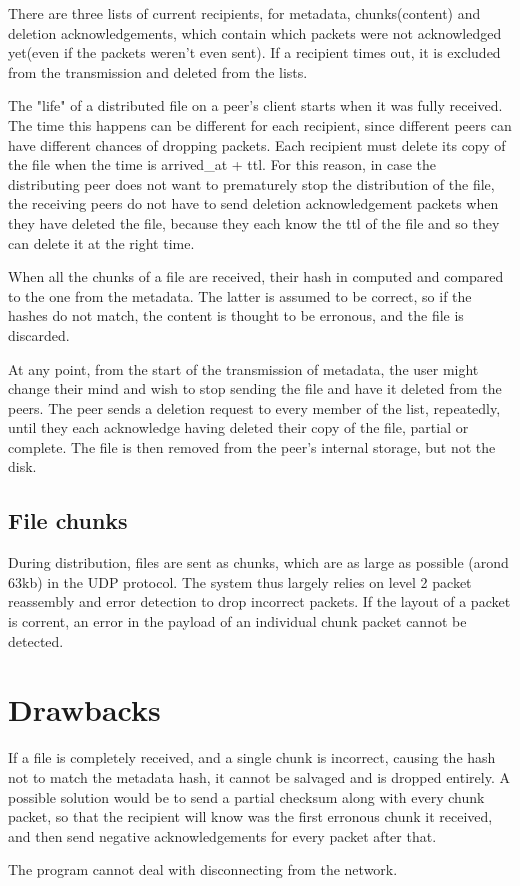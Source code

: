 \documentclass[a4paper, 10pt]{report}
\begin{document}
There are three lists of current recipients, for metadata, chunks(content) and deletion acknowledgements, which contain which packets were not acknowledged yet(even if the packets weren't even sent). If a recipient times out, it is excluded from the transmission and deleted from the lists.

The "life" of a distributed file on a peer's client starts when it was fully received. The time this happens can be different for each recipient, since different peers can have different chances of dropping packets. Each recipient must delete its copy of the file when the time is arrived\_at + ttl. For this reason, in case the distributing peer does not want to prematurely stop the distribution of the file, the receiving peers do not have to send deletion acknowledgement packets when they have deleted the file, because they each know the ttl of the file and so they can delete it at the right time.

When all the chunks of a file are received, their hash in computed and compared to the one from the metadata. The latter is assumed to be correct, so if the hashes do not match, the content is thought to be erronous, and the file is discarded.

At any point, from the start of the transmission of metadata, the user might change their mind and wish to stop sending the file and have it deleted from the peers. The peer sends a deletion request to every member of the list, repeatedly, until they each acknowledge having deleted their copy of the file, partial or complete. The file is then removed from the peer's internal storage, but not the disk.

\subsection{File chunks}
During distribution, files are sent as chunks, which are as large as possible (arond 63kb) in the UDP protocol. The system thus largely relies on level 2 packet reassembly and error detection to drop incorrect packets. If the layout of a packet is corrent, an error in the payload of an individual chunk packet cannot be detected.


\section{Drawbacks}
If a file is completely received, and a single chunk is incorrect, causing the hash not to match the metadata hash, it cannot be salvaged and is dropped entirely. A possible solution would be to send a partial checksum along with every chunk packet, so that the recipient will know was the first erronous chunk it received, and then send negative acknowledgements for every packet after that.

The program cannot deal with disconnecting from the network.
\end{document}

